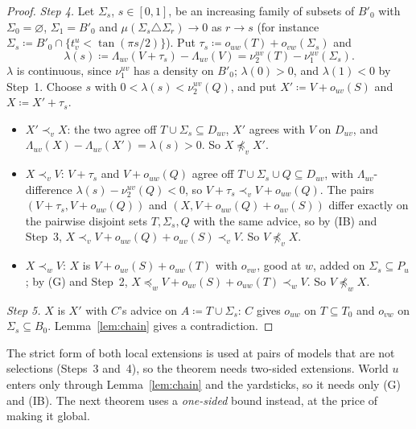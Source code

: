 \documentclass[11pt]{article}
\theoremstyle{definition}\newtheorem{definition}[theorem]{Definition}
\theoremstyle{remark}\newtheorem{remark}[theorem]{Remark}
\begin{document}
\begin{proof}
\emph{Step 4.} Let $\Sigma_s$, $s\in[0,1]$, be an increasing family of
subsets of $B'_0$ with $\Sigma_0=\varnothing$, $\Sigma_1=B'_0$ and
$\mu(\Sigma_s\triangle\Sigma_r)\to0$ as $r\to s$ (for instance
$\Sigma_s\coloneqq B'_0\cap\{t^u_v<\tan(\pi s/2)\}$). Put
$\tau_s\coloneqq o_{uw}(T)+o_{vw}(\Sigma_s)$ and
\[
 \lambda(s)\coloneqq\Lambda_{uv}(V+\tau_s)-\Lambda_{uv}(V)
 =\nu^{uv}_2(T)-\nu^{uv}_1(\Sigma_s).
\]
$\lambda$ is continuous, since $\nu^{uv}_1$ has a density on $B'_0$;
$\lambda(0)>0$, and $\lambda(1)<0$ by Step~1. Choose $s$ with
$0<\lambda(s)<\nu^{uv}_2(Q)$, and put $X'\coloneqq V+o_{uv}(S)$ and
$X\coloneqq X'+\tau_s$.
\begin{itemize}[leftmargin=*,itemsep=1pt]
\item $X'\prec_vX$: the two agree off $T\cup\Sigma_s\subseteq D_{uv}$, $X'$
agrees with $V$ on $D_{uv}$, and $\Lambda_{uv}(X)-\Lambda_{uv}(X')=
\lambda(s)>0$. So $X\not\preceq_vX'$.
\item $X\prec_vV$: $V+\tau_s$ and $V+o_{uw}(Q)$ agree off
$T\cup\Sigma_s\cup Q\subseteq D_{uv}$, with $\Lambda_{uv}$-difference
$\lambda(s)-\nu^{uv}_2(Q)<0$, so $V+\tau_s\prec_vV+o_{uw}(Q)$. The pairs
$(V+\tau_s,V+o_{uw}(Q))$ and $(X,V+o_{uw}(Q)+o_{uv}(S))$ differ exactly on
the pairwise disjoint sets $T,\Sigma_s,Q$ with the same advice, so by (IB)
and Step~3, $X\prec_vV+o_{uw}(Q)+o_{uv}(S)\prec_vV$. So $V\not\preceq_vX$.
\item $X\prec_wV$: $X$ is $V+o_{uv}(S)+o_{uw}(T)$ with $o_{vw}$, good at $w$,
added on $\Sigma_s\subseteq P_u$; by (G) and Step~2,
$X\preceq_wV+o_{uv}(S)+o_{uw}(T)\prec_wV$. So $V\not\preceq_wX$.
\end{itemize}

\emph{Step 5.} $X$ is $X'$ with $C$'s advice on $A\coloneqq T\cup\Sigma_s$:
$C$ gives $o_{uw}$ on $T\subseteq T_0$ and $o_{vw}$ on $\Sigma_s\subseteq B_0$.
Lemma~\ref{lem:chain} gives a contradiction.
\end{proof}

The strict form of both local extensions is used at pairs of models that are
not selections (Steps~3 and~4), so the theorem needs two-sided extensions.
World $u$ enters only through Lemma~\ref{lem:chain} and the yardsticks, so it
needs only (G) and (IB). The next theorem uses a \emph{one-sided} bound
instead, at the price of making it global.
\end{document}

